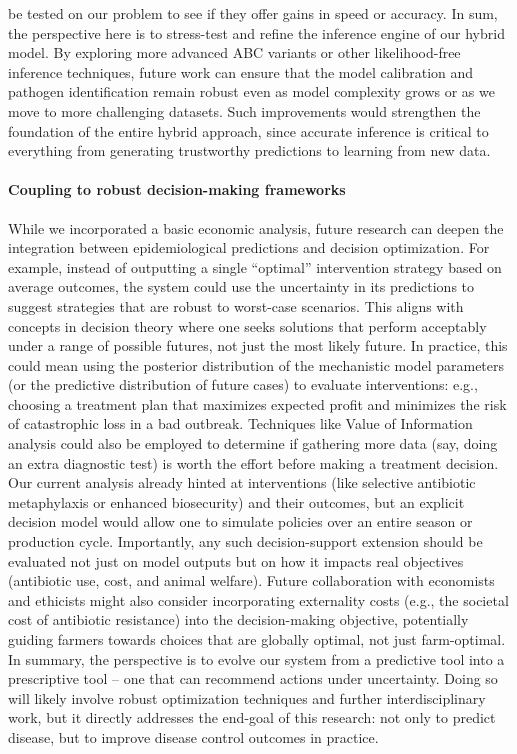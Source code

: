 be tested on our problem to see if they offer gains in speed or accuracy. In sum, the perspective here is to stress-test and refine the inference engine of our hybrid model. By exploring more advanced ABC variants or other likelihood-free inference techniques, future work can ensure that the model calibration and pathogen identification remain robust even as model complexity grows or as we move to more challenging datasets. Such improvements would strengthen the foundation of the entire hybrid approach, since accurate inference is critical to everything from generating trustworthy predictions to learning from new data.

\paragraph{Coupling to robust decision-making frameworks} While we incorporated a basic economic analysis, future research can deepen the integration between epidemiological predictions and decision optimization. For example, instead of outputting a single “optimal” intervention strategy based on average outcomes, the system could use the uncertainty in its predictions to suggest strategies that are robust to worst-case scenarios. This aligns with concepts in decision theory where one seeks solutions that perform acceptably under a range of possible futures, not just the most likely future. In practice, this could mean using the posterior distribution of the mechanistic model parameters (or the predictive distribution of future cases) to evaluate interventions: e.g., choosing a treatment plan that maximizes expected profit and minimizes the risk of catastrophic loss in a bad outbreak. Techniques like Value of Information analysis could also be employed to determine if gathering more data (say, doing an extra diagnostic test) is worth the effort before making a treatment decision. Our current analysis already hinted at interventions (like selective antibiotic metaphylaxis or enhanced biosecurity) and their outcomes, but an explicit decision model would allow one to simulate policies over an entire season or production cycle. Importantly, any such decision-support extension should be evaluated not just on model outputs but on how it impacts real objectives (antibiotic use, cost, and animal welfare). Future collaboration with economists and ethicists might also consider incorporating externality costs (e.g., the societal cost of antibiotic resistance) into the decision-making objective, potentially guiding farmers towards choices that are globally optimal, not just farm-optimal. In summary, the perspective is to evolve our system from a predictive tool into a prescriptive tool – one that can recommend actions under uncertainty. Doing so will likely involve robust optimization techniques and further interdisciplinary work, but it directly addresses the end-goal of this research: not only to predict disease, but to improve disease control outcomes in practice.

